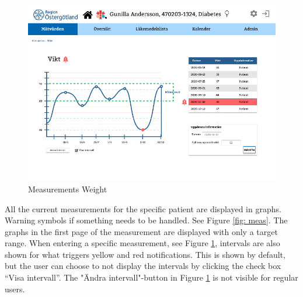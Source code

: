 \documentclass{scrreprt}
\begin{document}
\begin{figure}[h!]
    \centering
    \includegraphics[width=15cm]{measweight.png}
    \caption{Measurements Weight}
    \label{fig: measweight}
\end{figure}
All the current measurements for the specific patient are displayed in graphs. Warning symbols if something needs to be handled. See Figure \ref{fig: meas}.
The graphs in the first page of the measurement are displayed with only a target range. When entering a specific measurement, see Figure \ref{fig: measweight}, intervals are also shown for what triggers yellow and red notifications. This is shown by default, but the user can choose to not display the intervals by clicking the check box “Visa intervall”. The "Ändra intervall"-button in Figure \ref{fig: measweight} is not visible for regular users.

\clearpage
\end{document}
